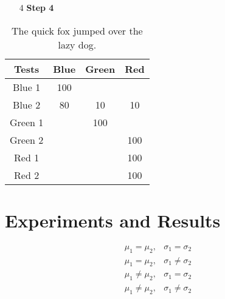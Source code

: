 \documentclass[12pt,phd ,a4paper,oneside]{ucl_thesis}
\begin{document}
\begin{enumerate}	
	\item[4] \textbf{Step 4}
\end{enumerate}


\begin{table}[ht]
	\centering
	\begin{tabular}{|c|c|c|c|}
		\hline
		\textbf{Tests} & \cellcolor{intnull}\textbf{Blue} & \cellcolor{lightgreen}\textbf{Green} & \cellcolor{red}\textbf{Red} \\ \hline
		Blue 1 & \cellcolor{intnull}100 & & \\ \hline
		Blue 2 & \cellcolor{intnull}80 & 10 & 10 \\ \hline
		Green 1 & & \cellcolor{lightgreen}100 & \\ \hline
		Green 2 & & \cellcolor{lightgreen} & 100 \\ \hline
		Red 1 & & & \cellcolor{red} 100 \\ \hline
		Red 2 & & &\cellcolor{red} 100 \\ \hline
	\end{tabular}
	\caption[Something]{The quick fox jumped over the lazy dog.}\label{table9}
\end{table}

\section{Experiments and Results}\label{SVMExperimentsExperiments}

\begin{equation}\label{equation20}
\begin{matrix}
\mu_{1}=\mu_{2}, & \sigma_{1}=\sigma_{2}\\ 
\mu_{1}=\mu_{2}, & \sigma_{1}\neq\sigma_{2}\\ 
\mu_{1}\neq\mu_{2}, & \sigma_{1}=\sigma_{2}\\ 
\mu_{1}\neq\mu_{2}, & \sigma_{1}\neq\sigma_{2}
\end{matrix}
\end{equation}
\end{document}
